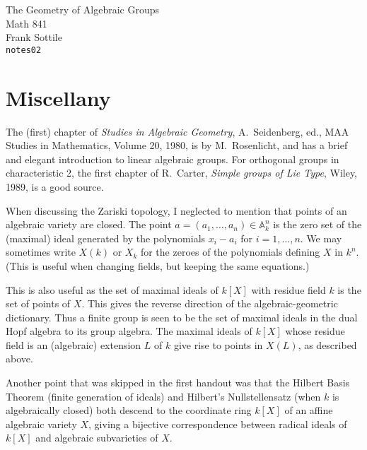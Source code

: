 \documentclass[12pt]{amsart}
\def\silentfootnote#1{{\let\thefootnote\relax\footnotetext{#1}}}
\begin{document}
\begin{center}
\Large
The Geometry of Algebraic Groups\\
\large
Math 841\\
Frank Sottile\\
{\tt notes02}
\end{center}\bigskip

\silentfootnote{\sl Version of 7 February 2000.} 

\section*{Miscellany}

The (first) chapter of {\it Studies in Algebraic Geometry}, A.~Seidenberg,
ed., MAA Studies in Mathematics, Volume 20, 1980, is by M.~Rosenlicht, and
has a brief and elegant introduction to linear algebraic groups.
For orthogonal groups in characteristic 2, the first chapter of R.~Carter, 
{\it Simple groups of Lie Type}, Wiley, 1989, is a good source.
\bigskip


When discussing the Zariski topology, I neglected to mention that points of
an algebraic variety are closed.
The point $a=(a_1,\ldots,a_n)\in{\mathbb A}^n_k$ is the zero set of the
(maximal) ideal generated by the polynomials $x_i-a_i$ for $i=1,\ldots,n$.
We may sometimes write $X(k)$ or $X_k$ for the zeroes of the polynomials
defining $X$ in $k^n$.
(This is useful when changing fields, but keeping the
same equations.)

This is also useful as the set of maximal ideals of $k[X]$ with residue
field $k$ is the set of points of $X$.
This gives the reverse direction of the algebraic-geometric dictionary.
Thus a finite group is seen to be the set of maximal ideals in the dual Hopf
algebra to its group algebra.
The maximal ideals of $k[X]$ whose residue field is an (algebraic) extension
$L$ of $k$ give rise to points in $X(L)$, as described above.
\bigskip

Another point that was skipped in the first handout was that the Hilbert 
Basis Theorem  (finite generation of ideals) and Hilbert's Nullstellensatz
(when $k$ is algebraically closed) both descend to the coordinate ring
$k[X]$ of an affine algebraic variety $X$, giving a bijective correspondence
between radical 
ideals of $k[X]$ and algebraic subvarieties of $X$.
\bigskip
\end{document}
